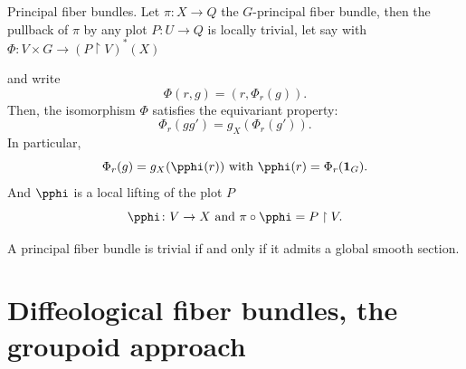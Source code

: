 \begin{Article}{Principal fiber bundles.}{}
   Let $\pi \colon X \to Q$ the $G$-principal fiber bundle,
  then the pullback of $\pi$ by any plot $P \colon U \to Q$ is locally trivial,
  let say with $\Phi \colon V \times G \to (P \restriction V)^*(X)$
  \begin{center}
  \end{center}
  and write
  $$%
    \Phi(r,g) = (r, \Phi_r(g)).
  $$%
  Then,
  the isomorphism $\Phi$ satisfies the equivariant property:
  $$%
    \Phi_r(gg') = g_X(\Phi_r(g')).
  $$%
  In particular,
  $$%
    \Phi_r(g) = g_X(\pphi(r))
    \SpacedText{with}
    \pphi(r) = \Phi_r(\Id_G).
  $$%
  And $\pphi$ is a local lifting of the plot $P$
  $$%
    \pphi \colon V \to X
    \SpacedText{and}
    \pi \circ \pphi = P \restriction V.
  $$%
  \begin{center}
  \end{center}

   A principal fiber bundle is trivial if and only if it admits a global smooth section.
\end{Article}

\section{Diffeological fiber bundles, the groupoid approach}

